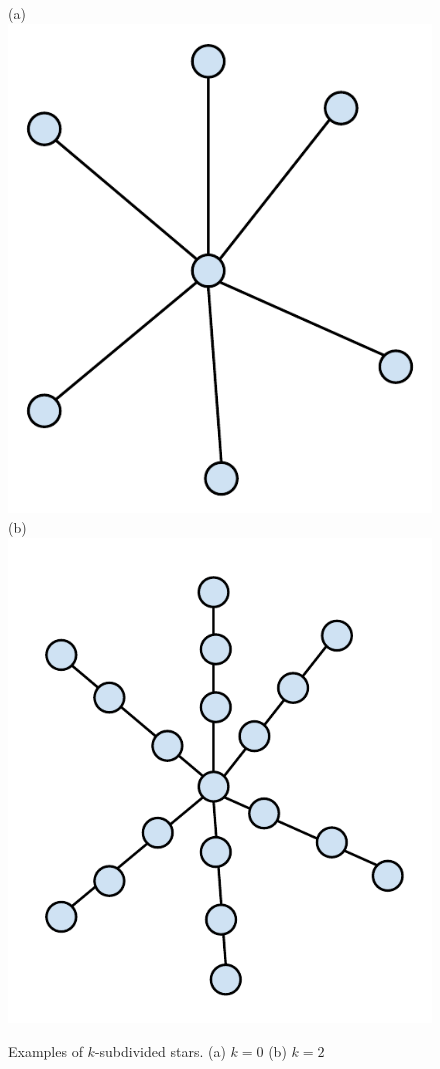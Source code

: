 \documentclass[MS,synopsis]{iitmdiss}
\def \figtabsize {\footnotesize}
\begin{document}
\begin{figure}[htbp]
  \centering
  (a) \includegraphics[scale=0.4]{../img/star.pdf}
  (b) \includegraphics[scale=0.4]{../img/kstar.pdf}
  \caption{\figtabsize Examples of $k$-subdivided stars. (a) $k = 0$ (b) $k = 2$ }
  \label{fig:ksubstar}
\end{figure}
\end{document}
